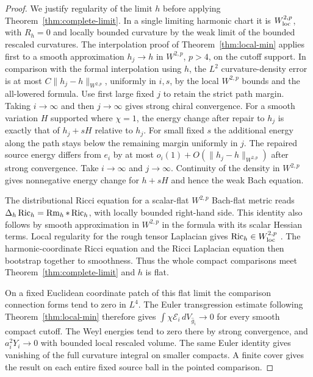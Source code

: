 \begin{proof}
We justify regularity of the limit \(h\) before applying
Theorem~\ref{thm:complete-limit}. In a single limiting harmonic
chart it is \(W^{2,p}_{\rm loc}\), with \(R_h=0\) and locally bounded
curvature by the weak limit of the bounded rescaled curvatures.
The interpolation proof of Theorem~\ref{thm:local-min} applies
first to a smooth approximation \(h_j\to h\) in \(W^{2,p}\),
\(p>4\), on the cutoff support. In comparison with the formal
interpolation using \(h\), the \(L^2\) curvature-density error is
at most \(C\|h_j-h\|_{W^{2,p}}\), uniformly in \(i,s\), by the
local \(W^{2,p}\) bounds and the all-lowered formula. Use first
large fixed \(j\) to retain the strict path margin. Taking \(i\to
\infty\) and then \(j\to\infty\) gives strong chiral convergence.
For a smooth variation \(H\) supported where \(\chi=1\), the energy
change after repair to \(h_j\) is exactly that of \(h_j+sH\)
relative to \(h_j\). For small fixed \(s\) the additional energy
along the path stays below the remaining margin uniformly in \(j\).
The repaired source energy differs from \(e_i\) by at most
\(o_i(1)+O(\|h_j-h\|_{W^{2,p}})\) after strong convergence.
Take \(i\to\infty\) and \(j\to\infty\). Continuity of the density
in \(W^{2,p}\) gives nonnegative energy change for \(h+sH\)
and hence the weak Bach equation.

The distributional Ricci equation for a scalar-flat \(W^{2,p}\)
Bach-flat metric reads \(\Delta_h\operatorname{Ric}_h=\operatorname{Rm}_h*\operatorname{Ric}_h\), with locally
bounded right-hand side. This identity also follows by smooth
approximation in \(W^{2,p}\) in the formula with its scalar
Hessian terms. Local regularity for the rough tensor Laplacian
gives \(\operatorname{Ric}_h\in W^{2,p}_{\rm loc}\)
\cite[Theorem 2.2(ii), Lemma 5.1]{AvalosCogoRoyoAbrego2026Bach}.
The harmonic-coordinate Ricci equation and the Ricci Laplacian
equation then bootstrap together to smoothness. Thus the whole
compact comparisons meet Theorem~\ref{thm:complete-limit} and
\(h\) is flat.

On a fixed Euclidean coordinate patch of this flat limit the
comparison connection forms tend to zero in \(L^4\). The Euler
transgression estimate following Theorem~\ref{thm:local-min}
therefore gives \(\int\chi\mathcal E_i\,dV_{\widehat g_i}\to0\)
for every smooth compact cutoff. The Weyl energies tend to zero
there by strong convergence, and \(a_i^2Y_i\to0\) with bounded
local rescaled volume. The same Euler identity gives vanishing
of the full curvature integral on smaller compacts. A finite
cover gives the result on each entire fixed source ball in the
pointed comparison.


\end{proof}
